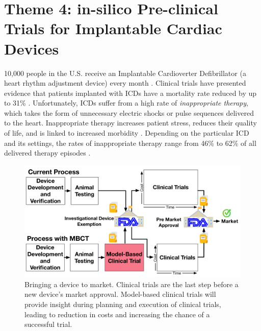 \chapter{Theme 4: in-silico Pre-clinical Trials for Implantable Cardiac Devices} 
10,000 people in the U.S. receive an Implantable Cardioverter Defibrillator (a heart rhythm adjustment device) every month \cite{asktheicd}.
Clinical trials have presented evidence that patients implanted with ICDs have a mortality rate reduced by up to 31\% \cite{maditrit}.
Unfortunately, ICDs suffer from a high rate of \emph{inappropriate therapy}, which takes the form of unnecessary electric shocks or pulse sequences delivered to the heart.
Inappropriate therapy increases patient stress, reduces their quality of life, and is linked to increased morbidity \cite{shock_mortality}.
Depending on the particular ICD and its settings, the rates of inappropriate therapy range from 46\% to 62\% of all delivered therapy episodes \cite{GoldABBTB11_RIGHTresults}.
	\begin{figure}[t]
		\centering
		\includegraphics[scale=0.5]{figures/figTransResearchSpectrum.pdf}
		\caption{\small Bringing a device to market.
			Clinical trials are the last step before a new device's market approval.
			Model-based clinical trials will provide insight during planning and execution of clinical trials, leading to reduction in costs and increasing the chance of a successful trial.}
		\label{fig:spectrum}
	\end{figure}


